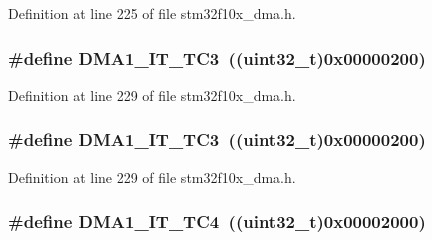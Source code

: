 Definition at line 225 of file stm32f10x\+\_\+dma.\+h.

\subsubsection[{\texorpdfstring{D\+M\+A1\+\_\+\+I\+T\+\_\+\+T\+C3}{DMA1_IT_TC3}}]{\setlength{\rightskip}{0pt plus 5cm}\#define D\+M\+A1\+\_\+\+I\+T\+\_\+\+T\+C3~(({\bf uint32\+\_\+t})0x00000200)}\hypertarget{group___d_m_a__interrupts__definition_ga37c375d4e3d681efecddc9f25c0c7bcd}{}\label{group___d_m_a__interrupts__definition_ga37c375d4e3d681efecddc9f25c0c7bcd}


Definition at line 229 of file stm32f10x\+\_\+dma.\+h.

\subsubsection[{\texorpdfstring{D\+M\+A1\+\_\+\+I\+T\+\_\+\+T\+C3}{DMA1_IT_TC3}}]{\setlength{\rightskip}{0pt plus 5cm}\#define D\+M\+A1\+\_\+\+I\+T\+\_\+\+T\+C3~(({\bf uint32\+\_\+t})0x00000200)}\hypertarget{group___d_m_a__interrupts__definition_ga37c375d4e3d681efecddc9f25c0c7bcd}{}\label{group___d_m_a__interrupts__definition_ga37c375d4e3d681efecddc9f25c0c7bcd}


Definition at line 229 of file stm32f10x\+\_\+dma.\+h.

\subsubsection[{\texorpdfstring{D\+M\+A1\+\_\+\+I\+T\+\_\+\+T\+C4}{DMA1_IT_TC4}}]{\setlength{\rightskip}{0pt plus 5cm}\#define D\+M\+A1\+\_\+\+I\+T\+\_\+\+T\+C4~(({\bf uint32\+\_\+t})0x00002000)}\hypertarget{group___d_m_a__interrupts__definition_ga4f6dd1c5092ca262f38c8bb8a7dc2986}{}\label{group___d_m_a__interrupts__definition_ga4f6dd1c5092ca262f38c8bb8a7dc2986}


